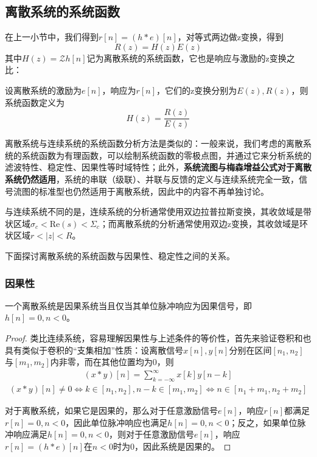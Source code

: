\subsection{离散系统的系统函数}\label{sub:discrete_system_function}

在上一小节中，我们得到$r[n]=(h*e)[n]$，对等式两边做z变换，得到
\[R(z)=H(z)E(z)\]
其中$H(z)=\mathcal{Z} h[n]$记为离散系统的系统函数，它也是响应与激励的z变换之比：
\begin{definition}[离散系统的系统函数]
    设离散系统的激励为$e[n]$，响应为$r[n]$，它们的z变换分别为$E(z),R(z)$，则系统函数定义为
    \[H(z)=\frac{R(z)}{E(z)}\]
\end{definition}

离散系统与连续系统的系统函数分析方法是类似的：一般来说，我们考虑的离散系统的系统函数为有理函数，可以绘制系统函数的零极点图，并通过它来分析系统的滤波特性、稳定性、因果性等时域特性；此外，\textbf{系统流图与梅森增益公式对于离散系统仍然适用}，系统的串联（级联）、并联与反馈的定义与连续系统完全一致，信号流图的标准型也仍然适用于离散系统，因此中的内容不再单独讨论。

与连续系统不同的是，连续系统的分析通常使用双边拉普拉斯变换，其收敛域是带状区域$\sigma_{c}<\mathrm{Re}(s)<\Sigma_{c}$；而离散系统的分析通常使用双边z变换，其收敛域是环状区域$r<|z|<R$。%

下面探讨离散系统的系统函数与因果性、稳定性之间的关系。

\subsubsection{因果性}

\begin{proposition}[因果性的时域判则]
    一个离散系统是因果系统当且仅当其单位脉冲响应为因果信号，即$h[n]=0,n<0$。
\end{proposition}
\begin{proof}
    类比连续系统，容易理解因果性与上述条件的等价性，首先来验证卷积和也具有类似于卷积的“支集相加”性质：设离散信号$x[n],y[n]$分别在区间$[n_1,n_2]$与$[m_1,m_2]$内非零，而在其他位置均为0，则
    \begin{align*}
        (x*y)[n]=\sum_{k=-\infty}^{\infty}x[k]y[n-k]
    \end{align*}
    \begin{align*}
        (x*y)[n]\neq 0\iff k\in[n_1,n_2],n-k\in[m_1,m_2]\iff n\in[n_1+m_1,n_2+m_2]
    \end{align*}
    
    对于离散系统，如果它是因果的，那么对于任意激励信号$e[n]$，响应$r[n]$都满足$r[n]=0,n<0$，因此单位脉冲响应也满足$h[n]=0,n<0$；反之，如果单位脉冲响应满足$h[n]=0,n<0$，则对于任意激励信号$e[n]$，响应$r[n]=(h*e)[n]$在$n<0$时为0，因此系统是因果的。
\end{proof}

